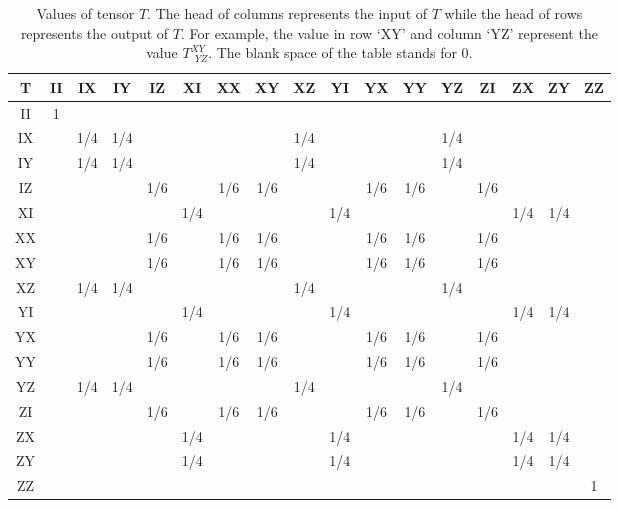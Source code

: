 \documentclass{article}
\begin{document}
\begin{table}
\centering
\begin{tabular}{|c|c|c|c|c|c|c|c|c|c|c|c|c|c|c|c|c|}
	\hline
	T  &II &IX &IY &IZ &XI &XX &XY &XZ &YI &YX &YY &YZ &ZI &ZX &ZY &ZZ \\ \hline
    II & 1 &   &   &   &   &   &   &   &   &   &   &   &   &   &   &   \\ \hline
    IX &   &1/4&1/4&   &   &   &   &1/4&   &   &   &1/4&   &   &   &   \\ \hline
    IY &   &1/4&1/4&   &   &   &   &1/4&   &   &   &1/4&   &   &   &   \\ \hline
    IZ &   &   &   &1/6&   &1/6&1/6&   &   &1/6&1/6&   &1/6&   &   &   \\ \hline
    XI &   &   &   &   &1/4&   &   &   &1/4&   &   &   &   &1/4&1/4&   \\ \hline
    XX &   &   &   &1/6&   &1/6&1/6&   &   &1/6&1/6&   &1/6&   &   &   \\ \hline
    XY &   &   &   &1/6&   &1/6&1/6&   &   &1/6&1/6&   &1/6&   &   &   \\ \hline
    XZ &   &1/4&1/4&   &   &   &   &1/4&   &   &   &1/4&   &   &   &   \\ \hline
    YI &   &   &   &   &1/4&   &   &   &1/4&   &   &   &   &1/4&1/4&   \\ \hline
    YX &   &   &   &1/6&   &1/6&1/6&   &   &1/6&1/6&   &1/6&   &   &   \\ \hline
    YY &   &   &   &1/6&   &1/6&1/6&   &   &1/6&1/6&   &1/6&   &   &   \\ \hline
    YZ &   &1/4&1/4&   &   &   &   &1/4&   &   &   &1/4&   &   &   &   \\ \hline
    ZI &   &   &   &1/6&   &1/6&1/6&   &   &1/6&1/6&   &1/6&   &   &   \\ \hline
    ZX &   &   &   &   &1/4&   &   &   &1/4&   &   &   &   &1/4&1/4&   \\ \hline
    ZY &   &   &   &   &1/4&   &   &   &1/4&   &   &   &   &1/4&1/4&   \\ \hline
    ZZ &   &   &   &   &   &   &   &   &   &   &   &   &   &   &   & 1 \\ \hline
\end{tabular}
\caption{Values of tensor $T$. The head of columns represents the input of $T$ while the head of rows represents the output of $T$. For example, the value in row `XY' and column `YZ' represent the value $T^{XY}_{~~YZ}$.  The blank space of the table stands for $0$.    }
\label{table: the 16x16 matrix of T}
\end{table}
\end{document}

